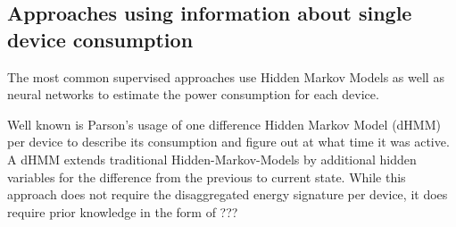 \documentclass{article}
\begin{document}
\subsection{Approaches using information about single device consumption}

The most common supervised approaches use Hidden Markov Models as well as neural networks to estimate the power consumption 
for each device.

Well known is Parson's \cite{Parson} usage of one difference Hidden Markov Model (dHMM) per device to describe its 
consumption and figure out at what time it was active.
A dHMM extends traditional Hidden-Markov-Models by additional hidden variables for the difference from the previous 
to current state. While this approach does not require the disaggregated energy signature per device, it does require 
prior knowledge in the form of ???
\end{document}
